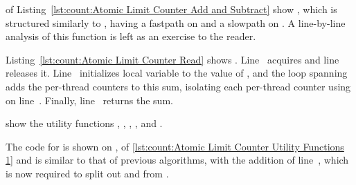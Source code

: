 \begin{fcvref}
 of
Listing~\ref{lst:count:Atomic Limit Counter Add and Subtract}
show , which is structured similarly to
, having a fastpath on
 and a slowpath on
.
A line-by-line analysis of this function is left as an exercise to
the reader.
\end{fcvref}

\begin{listing}[tbp]

\caption{Atomic Limit Counter Read}
\label{lst:count:Atomic Limit Counter Read}
\end{listing}

\begin{fcvref}
Listing~\ref{lst:count:Atomic Limit Counter Read} shows .
Line~ acquires  and
line~ releases it.
Line~ initializes local variable  to the value of
, and the loop spanning
 adds the
per-thread counters to this sum, isolating each per-thread counter
using  on line~.
Finally, line~ returns the sum.
\end{fcvref}

\begin{listing}[tbp]

\caption{Atomic Limit Counter Utility Functions 1}
\label{lst:count:Atomic Limit Counter Utility Functions 1}
\end{listing}

\begin{listing}[tb]

\caption{Atomic Limit Counter Utility Functions 2}
\label{lst:count:Atomic Limit Counter Utility Functions 2}
\end{listing}

show the utility functions
,
,
,
, and
.
\begin{fcvref}
The code for  is shown on
,
of \cref{lst:count:Atomic Limit Counter Utility Functions 1} and
is similar to that of previous algorithms, with the addition of
line~, which is now required to split out  and
 from .
\end{fcvref}

